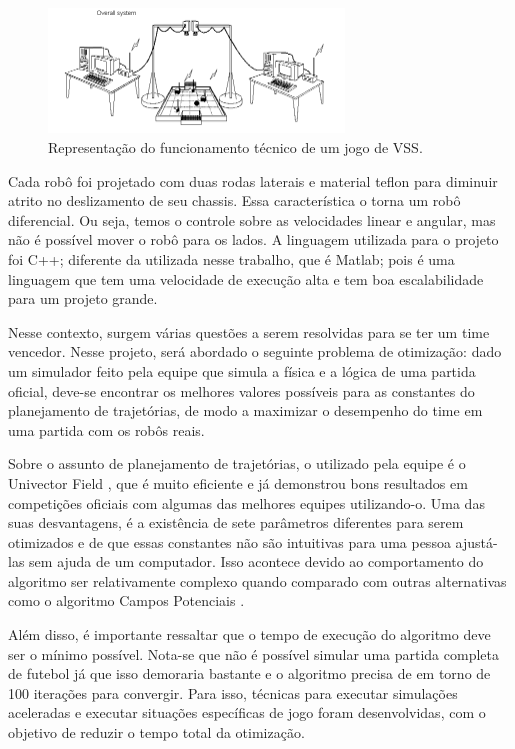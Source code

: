 \documentclass[10pt,fleqn,a4paper]{article}
\begin{document}
\begin{figure}[H]
	\centering
		\includegraphics[width=0.7\textwidth]{figures/overview.png}
  \caption{Representação do funcionamento técnico de um jogo de VSS.}
	\label{fig:funcioamento}
\end{figure}

Cada robô foi projetado com duas rodas laterais e material teflon para diminuir atrito no deslizamento de seu chassis. Essa característica o torna um robô diferencial. Ou seja, temos o controle sobre as velocidades linear e angular, mas não é possível mover o robô para os lados. A linguagem utilizada para o projeto foi C++; diferente da utilizada nesse trabalho, que é Matlab; pois é uma linguagem que tem uma velocidade de execução alta e tem boa escalabilidade para um projeto grande. 

Nesse contexto, surgem várias questões a serem resolvidas para se ter um time vencedor. Nesse projeto, será abordado o seguinte problema de otimização: dado um simulador feito pela equipe que simula a física e a lógica de uma partida oficial, deve-se encontrar os melhores valores possíveis para as constantes do planejamento de trajetórias, de modo a maximizar o desempenho do time em uma partida com os robôs reais.

Sobre o assunto de planejamento de trajetórias, o utilizado pela equipe é o Univector Field \cite{univector}, que é muito eficiente e já demonstrou bons resultados em competições oficiais com algumas das melhores equipes utilizando-o. Uma das suas desvantagens, é a existência de sete parâmetros diferentes para serem otimizados e de que essas constantes não são intuitivas para uma pessoa ajustá-las sem ajuda de um computador. Isso acontece devido ao comportamento do algoritmo ser relativamente complexo quando comparado com outras alternativas como o algoritmo Campos Potenciais \cite{potential_fields}.

Além disso, é importante ressaltar que o tempo de execução do algoritmo deve ser o mínimo possível. Nota-se que não é possível simular uma partida completa de futebol já que isso demoraria bastante e o algoritmo precisa de em torno de 100 iterações para convergir. Para isso, técnicas para executar simulações aceleradas e executar situações específicas de jogo foram desenvolvidas, com o objetivo de reduzir o tempo total da otimização.
\end{document}
